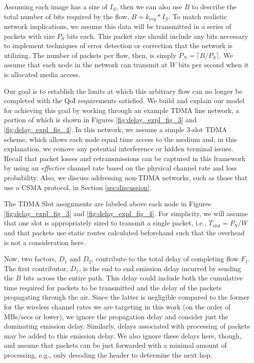 Assuming each image has a size of $I_S$, then we can also use $B$ to describe the total number of bits required by the flow, $B=k_{req}*I_S$.  To match realistic network implications, we assume this data will be transmitted in a series of packets with size $P_S$ bits each. This packet size should include any bits necessary to implement techniques of error detection or correction that the network is utilizing. The number of packets per flow, then, is simply $P_N = \lceil B/P_S \rceil$.  We assume that each node in the network can transmit at $W$ bits per second when it is allocated media access.

Our goal is to establish the limits at which this arbitrary flow can no longer be completed with the QoI requirements satisfied.  We build and explain our model for achieving this goal by working through an example TDMA line network, a portion of which is shown in Figures \ref{fig:delay_expl_fig_3} and \ref{fig:delay_expl_fig_4}. In this network, we assume a simple 3-slot TDMA scheme, which allows each node equal time access to the medium and, in this explanation, we remove any potential interference or hidden terminal issues. Recall that packet losses and retransmissions can be captured in this framework by using an \emph{effective} channel rate based on the physical channel rate and loss probability. Also, we discuss addressing non-TDMA networks, such as those that use a CSMA protocol, in Section \ref{sec:discussion}. 

The TDMA Slot assignments are labeled above each node in Figures \ref{fig:delay_expl_fig_3} and \ref{fig:delay_expl_fig_4}.  For simplicity, we will assume that one slot is appropriately sized to transmit a single packet, i.e., $T_{slot} = P_S/W$ and that packets use static routes calculated beforehand such that the overhead is not a consideration here.

Now, two factors, $D_1$ and $D_2$, contribute to the total delay of completing flow $F_1$.  The first contributor, $D_1$, is the end to end emission delay incurred by sending the $B$ bits across the entire path. This delay could include both the cumulative time required for packets to be transmitted and the delay of the packets propagating through the air. Since the latter is negligible compared to the former for the wireless channel rates we are targeting in this work (on the order of MBs/secs or lower), we ignore the propagation delay and consider just the dominating emission delay. Similarly, delays associated with processing of packets may be added to this emission delay. We also ignore these delays here, though, and assume that packets can be just forwarded with a minimal amount of processing, e.g., only decoding the header to determine the next hop.


